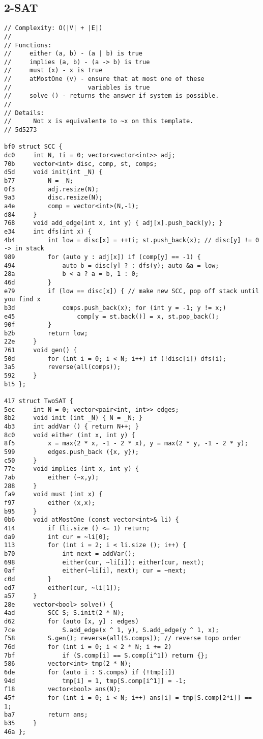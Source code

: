 \documentclass[11pt, a4paper, twoside]{article}
\begin{document}
\subsection{2-SAT}
\begin{lstlisting}
// Complexity: O(|V| + |E|)
// 
// Functions:
//     either (a, b) - (a | b) is true
//     implies (a, b) - (a -> b) is true
//     must (x) - x is true
//     atMostOne (v) - ensure that at most one of these
//                     variables is true
//     solve () - returns the answer if system is possible.
// 
// Details:
//      Not x is equivalente to ~x on this template.
// 5d5273

bf0 struct SCC {
dc0     int N, ti = 0; vector<vector<int>> adj;
70b     vector<int> disc, comp, st, comps;
d5d     void init(int _N) { 
b77         N = _N; 
0f3         adj.resize(N);
9a3         disc.resize(N);
a4e         comp = vector<int>(N,-1); 
d84     }
768     void add_edge(int x, int y) { adj[x].push_back(y); }
e34     int dfs(int x) {
4b4         int low = disc[x] = ++ti; st.push_back(x); // disc[y] != 0 -> in stack
989         for (auto y : adj[x]) if (comp[y] == -1) {
494             auto b = disc[y] ? : dfs(y); auto &a = low;
28a             b < a ? a = b, 1 : 0;
46d         } 
e79         if (low == disc[x]) { // make new SCC, pop off stack until you find x
b3d             comps.push_back(x); for (int y = -1; y != x;) 
e45                 comp[y = st.back()] = x, st.pop_back();
90f         }
b2b         return low;
22e     }
761     void gen() {
50d         for (int i = 0; i < N; i++) if (!disc[i]) dfs(i);
3a5         reverse(all(comps));
592     }
b15 };
 
417 struct TwoSAT {
5ec     int N = 0; vector<pair<int, int>> edges;
8b2     void init (int _N) { N = _N; }
4b3     int addVar () { return N++; }
8c0     void either (int x, int y) { 
8f5         x = max(2 * x, -1 - 2 * x), y = max(2 * y, -1 - 2 * y);
599         edges.push_back ({x, y}); 
c50     }
77e     void implies (int x, int y) { 
7ab         either (~x,y); 
288     }
fa9     void must (int x) { 
f97         either (x,x); 
b95     }
0b6     void atMostOne (const vector<int>& li) {
414         if (li.size () <= 1) return;
da9         int cur = ~li[0];
113         for (int i = 2; i < li.size (); i++) {
b70             int next = addVar();
698             either(cur, ~li[i]); either(cur, next);
0af             either(~li[i], next); cur = ~next;
c0d         }
ed7         either(cur, ~li[1]);
a57     }
28e     vector<bool> solve() {
4ad         SCC S; S.init(2 * N);
d62         for (auto [x, y] : edges) 
7ce             S.add_edge(x ^ 1, y), S.add_edge(y ^ 1, x);
f58         S.gen(); reverse(all(S.comps)); // reverse topo order
76d         for (int i = 0; i < 2 * N; i += 2) 
7bf             if (S.comp[i] == S.comp[i^1]) return {};
586         vector<int> tmp(2 * N); 
6de         for (auto i : S.comps) if (!tmp[i]) 
94d             tmp[i] = 1, tmp[S.comp[i^1]] = -1;
f18         vector<bool> ans(N); 
45f         for (int i = 0; i < N; i++) ans[i] = tmp[S.comp[2*i]] == 1;
ba7         return ans;
b35     }
46a };
\end{lstlisting}
\end{document}
